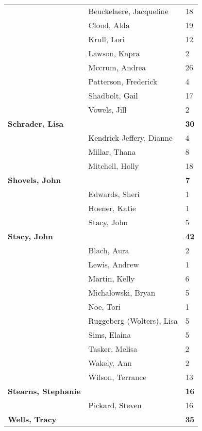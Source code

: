 \documentclass{article}\usepackage[]{graphicx}\usepackage[]{color}
\begin{document}
{\begin{longtable} { >{\raggedright}p{}|p{}p{}}
   & Beuckelaere, Jacqueline & 18 \\ 
   & Cloud, Alda & 19 \\ 
   & Krull, Lori & 12 \\ 
   \rowcolor[gray]{0.90} & Lawson, Kapra & 2 \\ 
   \rowcolor[gray]{0.90} & Mccrum, Andrea & 26 \\ 
   \rowcolor[gray]{0.90} & Patterson, Frederick & 4 \\ 
   & Shadbolt, Gail & 17 \\ 
   & Vowels, Jill & 2 \\ 
  \textbf{Schrader, Lisa} &  & \hspace{2cm}\textbf{30} \\ 
   \rowcolor[gray]{0.90} & Kendrick-Jeffery, Dianne & 4 \\ 
   \rowcolor[gray]{0.90} & Millar, Thana & 8 \\ 
   \rowcolor[gray]{0.90} & Mitchell, Holly & 18 \\ 
  \textbf{Shovels, John} &  & \hspace{2cm}\textbf{7} \\ 
   & Edwards, Sheri & 1 \\ 
   & Hoener, Katie & 1 \\ 
   \rowcolor[gray]{0.90} & Stacy, John & 5 \\ 
   \rowcolor[gray]{0.90}\textbf{Stacy, John} &  & \hspace{2cm}\textbf{42} \\ 
   \rowcolor[gray]{0.90} & Blach, Aura & 2 \\ 
   & Lewis, Andrew & 1 \\ 
   & Martin, Kelly & 6 \\ 
   & Michalowski, Bryan & 5 \\ 
   \rowcolor[gray]{0.90} & Noe, Tori & 1 \\ 
   \rowcolor[gray]{0.90} & Ruggeberg (Wolters), Lisa & 5 \\ 
   \rowcolor[gray]{0.90} & Sims, Elaina & 5 \\ 
   & Tasker, Melisa & 2 \\ 
   & Wakely, Ann & 2 \\ 
   & Wilson, Terrance & 13 \\ 
   \rowcolor[gray]{0.90}\textbf{Stearns, Stephanie} &  & \hspace{2cm}\textbf{16} \\ 
   \rowcolor[gray]{0.90} & Pickard, Steven & 16 \\ 
   \rowcolor[gray]{0.90}\textbf{Wells, Tracy} &  & \hspace{2cm}\textbf{35} \\ 

\end{longtable}}
\end{document}
